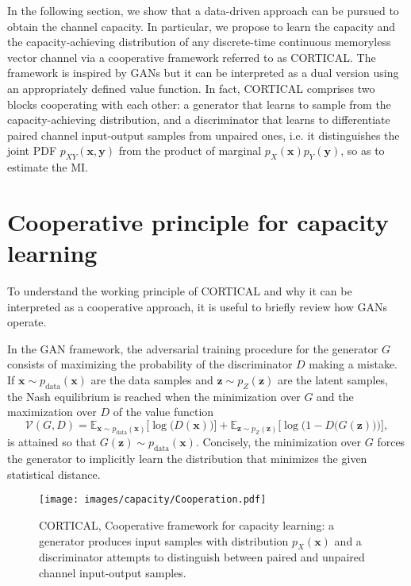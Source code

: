 In the following section, we show that a data-driven approach can be pursued to obtain the channel capacity. In particular, we propose to learn the capacity and the capacity-achieving distribution of any discrete-time continuous memoryless vector channel via a cooperative framework referred to as CORTICAL. The framework is inspired by GANs \cite{Goodfellow2014} but it can be interpreted as a dual version using an appropriately defined value function. In fact, CORTICAL comprises two blocks cooperating with each other: a generator that learns to sample from the capacity-achieving distribution, and a discriminator that learns to differentiate paired channel input-output samples from unpaired ones, i.e. it distinguishes the joint PDF $p_{XY}(\mathbf{x},\mathbf{y})$ from the product of marginal $p_{X}(\mathbf{x})p_{Y}(\mathbf{y})$, so as to estimate the MI. 


\section{Cooperative principle for capacity learning}
\label{sec:cortical_theory}
To understand the working principle of CORTICAL and why it can be interpreted as a cooperative approach, it is useful to briefly review how GANs operate. 

In the GAN framework, the adversarial training procedure for the generator $G$ consists of maximizing the probability of the discriminator $D$ making a mistake. If $\mathbf{x}\sim p_{\text{data}}(\mathbf{x})$ are the data samples and $\mathbf{z}\sim p_{Z}(\mathbf{z})$ are the latent samples, the Nash equilibrium is reached when the minimization over $G$ and the maximization over $D$ of the value function
\begin{equation}
\mathcal{V}(G,D) = \mathbb{E}_{\mathbf{x} \sim p_{\text{data}}(\mathbf{x})}\biggl[\log \bigl(D(\mathbf{x})\bigr)\biggr]  +\mathbb{E}_{\mathbf{z} \sim p_{Z}(\mathbf{z})}\biggl[\log\bigl(1-D\bigl(G(\mathbf{z})\bigr)\bigr)\biggr],
\label{eq:CORTICAL_GAN_value_function}
\end{equation}
is attained so that $G(\mathbf{z})\sim p_{\text{data}}(\mathbf{x})$. Concisely, the minimization over $G$ forces the generator to implicitly learn the distribution that minimizes the given statistical distance. 

\begin{figure}
	\centering
	\texttt{[image: images/capacity/Cooperation.pdf]}
	\caption{CORTICAL, Cooperative framework for capacity learning: a generator produces input samples with distribution $p_X(\mathbf{x})$ and a discriminator attempts to distinguish between paired and unpaired channel input-output samples.}
	\label{fig:CORTICAL_Cooperative_networks}
\end{figure}

